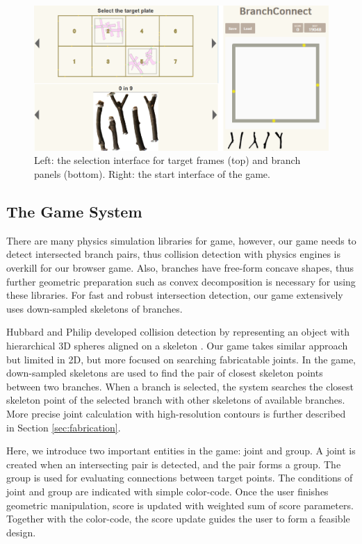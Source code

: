 \begin{figure}[ht]
  \begin{center}
    \includegraphics[width = 0.4\paperwidth]{images/interface/game_interface.png}
    \caption{Left: the selection interface for target frames (top) and branch panels (bottom). Right: the start interface of the game.}
    \label{fig:game_interface}
  \end{center}
\end{figure}
%
\subsection{The Game System}
There are many physics simulation libraries for game, however, our game needs to detect intersected branch pairs, thus collision detection with physics engines is overkill for our browser game.
Also, branches have free-form concave shapes, thus further geometric preparation such as convex decomposition is necessary for using these libraries.
For fast and robust intersection detection, our game extensively uses down-sampled skeletons of branches.

Hubbard and Philip developed collision detection by representing an object with hierarchical 3D spheres aligned on a skeleton \cite{Hubbard:1996:APS:231731.231732}.
Our game takes similar approach but limited in 2D, but more focused on searching fabricatable joints.
In the game, down-sampled skeletons are used to find the pair of closest skeleton points between two branches.
When a branch is selected, the system searches the closest skeleton point of the selected branch with other skeletons of available branches.
More precise joint calculation with high-resolution contours is further described in Section \ref{sec:fabrication}.


Here, we introduce two important entities in the game: joint and group.
A joint is created when an intersecting pair is detected, and the pair forms a group.
The group is used for evaluating connections between target points.
The conditions of joint and group are indicated with simple color-code.
Once the user finishes geometric manipulation, score is updated with weighted sum of score parameters.
Together with the color-code, the score update guides the user to form a feasible design.



